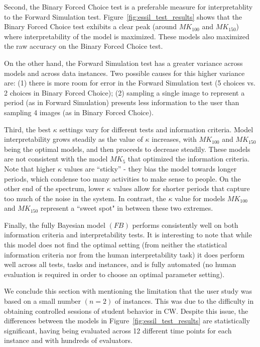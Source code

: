 \documentclass[letterpaper]{article} %
\begin{document}
Second, the Binary Forced Choice test is a preferable measure for interpretablity   to the Forward Simulation test. Figure~\ref{fig:essil_test_results} shows that the Binary Forced Choice test exhibits a clear peak (around $MK_{100}$ and $MK_{150}$) where interpretability of the model is maximized.
These models also maximized the  raw accuracy on the Binary Forced Choice test.

On the other hand, the Forward Simulation test has a greater variance across models and across data instances.
Two possible causes for this higher variance are: (1) there is more room for error in the Forward Simulation test (5 choices vs. 2 choices in Binary Forced Choice); (2) sampling a single image to represent a period (as in Forward Simulation) presents less information to the user than sampling 4 images (as in Binary Forced Choice).

Third, the best $\kappa$ settings vary for different tests and information criteria.
Model interpretability grows steadily as the value of $\kappa$ increases, with $MK_{100}$ and $MK_{150}$ being the optimal models, and then proceeds to decrease steadily.
These models are not consistent with the model $MK_5$ that optimized the information criteria.
Note that higher $\kappa$ values are ``sticky'' - they  bias the model towards longer periods, which condense too many activities to make sense to people.
On the other end of the spectrum, lower $\kappa$ values allow for shorter periods that capture too much of the noise in the system.
In contrast, the $\kappa$ value for  models $MK_{100}$ and $MK_{150}$
represent a ``sweet spot" in between these two extremes.


Finally, the fully Bayesian model $(FB)$ performs consistently well on both information criteria and interpretability tests. It is interesting to note that while this model does not find the optimal setting (from neither the statistical information criteria nor from the human interpretability task) it does perform well across all tests, tasks and instances, and is fully automated (no human evaluation is required in order to choose an optimal parameter setting).

We conclude this section with mentioning the limitation that the user study was based on a small number $(n=2)$  of instances. This was due to the difficulty in obtaining controlled sessions of student behavior in CW. Despite this issue, the differences between the models in Figure~\ref{fig:essil_test_results} are statistically significant, having being evaluated across 12 different time points for each instance and with hundreds of evaluators.
\end{document}
